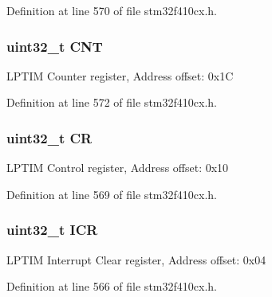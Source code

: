 Definition at line 570 of file stm32f410cx.\+h.

\subsubsection[{\texorpdfstring{C\+NT}{CNT}}]{ uint32\+\_\+t C\+NT}\hypertarget{struct_l_p_t_i_m___type_def_a6095a27d764d06750fc0d642e08f8b2a}{}\label{struct_l_p_t_i_m___type_def_a6095a27d764d06750fc0d642e08f8b2a}
L\+P\+T\+IM Counter register, Address offset\+: 0x1C 

Definition at line 572 of file stm32f410cx.\+h.

\subsubsection[{\texorpdfstring{CR}{CR}}]{ uint32\+\_\+t CR}\hypertarget{struct_l_p_t_i_m___type_def_ab40c89c59391aaa9d9a8ec011dd0907a}{}\label{struct_l_p_t_i_m___type_def_ab40c89c59391aaa9d9a8ec011dd0907a}
L\+P\+T\+IM Control register, Address offset\+: 0x10 

Definition at line 569 of file stm32f410cx.\+h.

\subsubsection[{\texorpdfstring{I\+CR}{ICR}}]{ uint32\+\_\+t I\+CR}\hypertarget{struct_l_p_t_i_m___type_def_a0a8c8230846fd8ff154b9fde8dfa0399}{}\label{struct_l_p_t_i_m___type_def_a0a8c8230846fd8ff154b9fde8dfa0399}
L\+P\+T\+IM Interrupt Clear register, Address offset\+: 0x04 

Definition at line 566 of file stm32f410cx.\+h.

